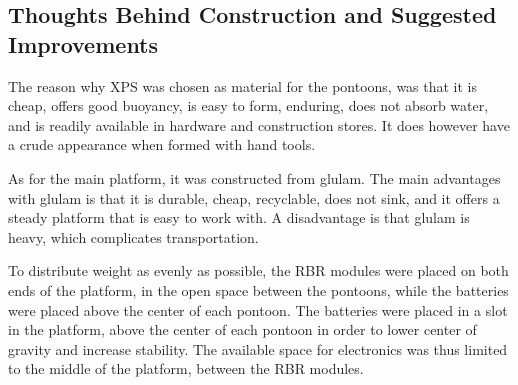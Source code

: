 \subsection{Thoughts Behind Construction and Suggested Improvements}
The reason why XPS was chosen as material for the pontoons, was that it is cheap, offers good buoyancy, is easy to form, enduring, does not absorb water, and is readily available in hardware and construction stores. It does however have a crude appearance when formed with hand tools.

As for the main platform, it was constructed from glulam. The main advantages with glulam is that it is durable, cheap, recyclable, does not sink, and it offers a steady platform that is easy to work with. A disadvantage is that glulam is heavy, which complicates transportation.




To distribute weight as evenly as possible, the RBR modules were placed on both ends of the platform, in the open space between the pontoons, while the batteries were placed above the center of each pontoon. The batteries were placed in a slot in the platform, above the center of each pontoon in order to lower center of gravity and increase stability. The available space for electronics was thus limited to the middle of the platform, between the RBR modules.

